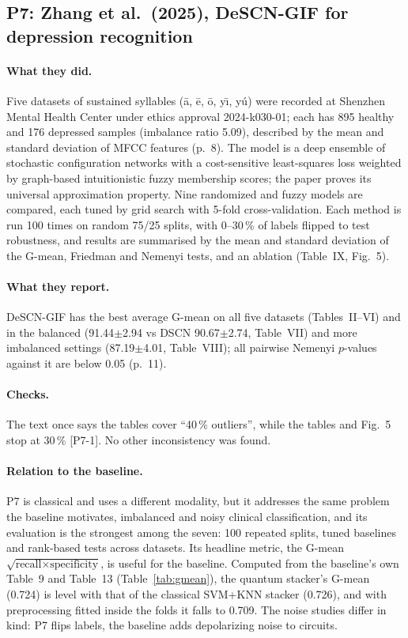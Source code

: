 \documentclass[11pt,a4paper]{article}
\newcommand{\chk}[1]{\textsf{\small [#1]}}
\begin{document}
\subsection{P7: Zhang et al.\ (2025), DeSCN-GIF for depression recognition}
\label{sec:p7}
\paragraph{What they did.} Five datasets of sustained syllables (\=a, \=e, \=o, y\=\i, y\'u) were recorded at Shenzhen Mental Health Center under ethics approval 2024-k030-01; each has 895 healthy and 176 depressed samples (imbalance ratio 5.09), described by the mean and standard deviation of MFCC features (p.~8). The model is a deep ensemble of stochastic configuration networks with a cost-sensitive least-squares loss weighted by graph-based intuitionistic fuzzy membership scores; the paper proves its universal approximation property. Nine randomized and fuzzy models are compared, each tuned by grid search with 5-fold cross-validation. Each method is run 100 times on random 75/25 splits, with 0--30\,\% of labels flipped to test robustness, and results are summarised by the mean and standard deviation of the G-mean, Friedman and Nemenyi tests, and an ablation (Table~IX, Fig.~5).

\paragraph{What they report.} DeSCN-GIF has the best average G-mean on all five datasets (Tables~II--VI) and in the balanced (91.44$\pm$2.94 vs DSCN 90.67$\pm$2.74, Table~VII) and more imbalanced settings (87.19$\pm$4.01, Table~VIII); all pairwise Nemenyi $p$-values against it are below 0.05 (p.~11).

\paragraph{Checks.} The text once says the tables cover ``40\,\% outliers'', while the tables and Fig.~5 stop at 30\,\% \chk{P7-1}. No other inconsistency was found.

\paragraph{Relation to the baseline.} P7 is classical and uses a different modality, but it addresses the same problem the baseline motivates, imbalanced and noisy clinical classification, and its evaluation is the strongest among the seven: 100 repeated splits, tuned baselines and rank-based tests across datasets. Its headline metric, the G-mean $\sqrt{\text{recall}\times\text{specificity}}$, is useful for the baseline. Computed from the baseline's own Table~9 and Table~13 (Table~\ref{tab:gmean}), the quantum stacker's G-mean (0.724) is level with that of the classical SVM+KNN stacker (0.726), and with preprocessing fitted inside the folds it falls to 0.709. The noise studies differ in kind: P7 flips labels, the baseline adds depolarizing noise to circuits.
\end{document}
